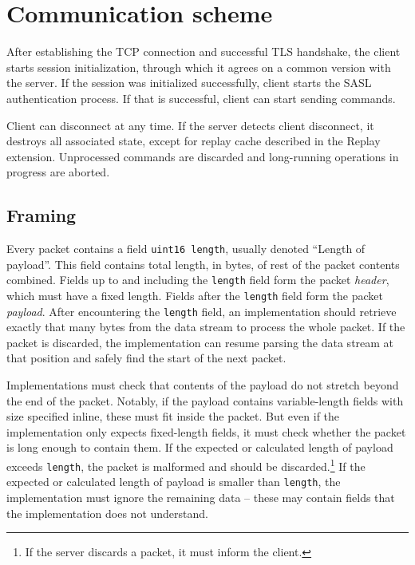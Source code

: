 
\section{Communication scheme}

After establishing the TCP connection and successful TLS handshake, the client starts session initialization,
through which it agrees on a common version with the server. If the session was initialized successfully,
client starts the SASL authentication process. If that is successful, client can start sending commands.

Client can disconnect at any time. If the server detects client disconnect, it destroys all associated state,
except for replay cache described in the Replay extension. Unprocessed commands are discarded and long-running
operations in progress are aborted.

%

\subsection{Framing}

Every packet contains a field {\tt uint16 length}, usually denoted ``Length of payload''. This field contains
total length, in bytes, of rest of the packet contents combined. Fields up to and including the {\tt length}
field form the packet {\it header}, which must have a fixed length. Fields after the {\tt length} field form
the packet {\it payload}. After encountering the {\tt length} field, an implementation should retrieve exactly
that many bytes from the data stream to process the whole packet. If the packet is discarded, the
implementation can resume parsing the data stream at that position and safely find the start of the next
packet.

Implementations must check that contents of the payload do not stretch beyond the end of the packet. Notably,
if the payload contains variable-length fields with size specified inline, these must fit inside the packet.
But even if the implementation only expects fixed-length fields, it must check whether the packet is long
enough to contain them. If the expected or calculated length of payload exceeds {\tt length}, the packet is
malformed and should be discarded.\footnote{If the server discards a packet, it must inform the client.} If
the expected or calculated length of payload is smaller than {\tt length}, the implementation must ignore the
remaining data -- these may contain fields that the implementation does not understand.

